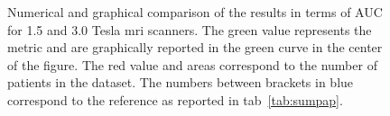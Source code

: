 \begin{figure}
{
 }
  \caption[Results comparison from the state-of-the-art in terms of \ac{auc}.]{Numerical and graphical comparison of the results in terms of AUC for 1.5 and 3.0 Tesla \ac{mri} scanners. The {\color{semiAuto}green} value represents the metric and are graphically reported in the {\color{semiAuto}green} curve in the center of the figure. The {\color{red}red} value and areas correspond to the number of patients in the dataset. The numbers between brackets in {blue\color{blue}} correspond to the reference as reported in \acs{tab}~\ref{tab:sumpap}.}
  \label{fig:auc}
\end{figure}

